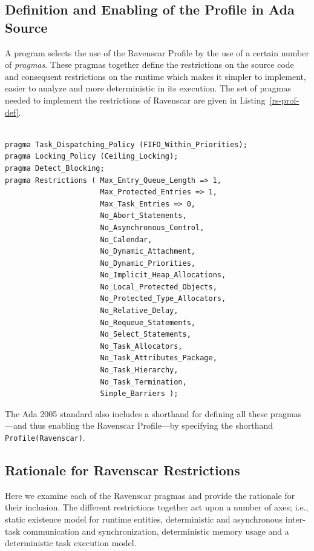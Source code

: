 \subsection{Definition and Enabling of the Profile in Ada Source}

A program selects the use of the Ravenscar Profile by the use of a
certain number of \emph{pragmas}. These pragmas together define the
restrictions on the source code and consequent restrictions on the
runtime which makes it simpler to implement, easier to analyze and
more deterministic in its execution. The set of pragmas needed to
implement the restrictions of Ravenscar are given in
Listing~\ref{rs-prof-def}.

\begin{minipage}{\listingwidth}
\begin{lstlisting}[label=rs-prof-def, caption=The Ada 95/2005 pragmas
    needed to enable the Ravenscar Profile]

pragma Task_Dispatching_Policy (FIFO_Within_Priorities);
pragma Locking_Policy (Ceiling_Locking);
pragma Detect_Blocking;
pragma Restrictions ( Max_Entry_Queue_Length => 1,
                      Max_Protected_Entries => 1,
                      Max_Task_Entries => 0,
                      No_Abort_Statements,
                      No_Asynchronous_Control,
                      No_Calendar,
                      No_Dynamic_Attachment,
                      No_Dynamic_Priorities,
                      No_Implicit_Heap_Allocations,
                      No_Local_Protected_Objects,
                      No_Protected_Type_Allocators,
                      No_Relative_Delay,
                      No_Requeue_Statements,
                      No_Select_Statements,
                      No_Task_Allocators,
                      No_Task_Attributes_Package,
                      No_Task_Hierarchy,
                      No_Task_Termination,
                      Simple_Barriers );
\end{lstlisting}
\end{minipage}

The Ada 2005 standard also includes a shorthand for defining all these
pragmas---and thus enabling the Ravenscar Profile---by specifying the
shorthand  \texttt{Profile(Ravenscar)}.

\subsection{Rationale for Ravenscar Restrictions}
Here we examine each of the Ravenscar pragmas and provide the
rationale for their inclusion. The different restrictions together act
upon a number of axes; i.e., static existence model for runtime
entities, deterministic and asynchronous inter-task communication and
synchronization, deterministic memory usage and a deterministic task
execution model.

